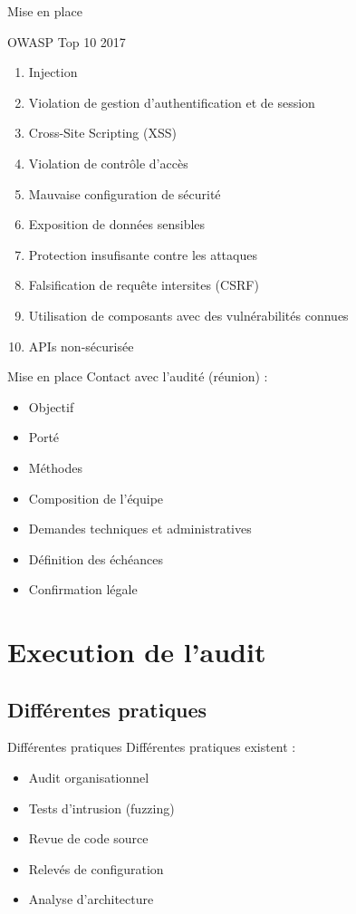 \documentclass{beamer}
\newcommand{\colorized}[1]{{\color{red}{#1}}}
\begin{document}
		\begin{frame}{Mise en place}
			\begin{block}{OWASP Top 10 2017}
				\begin{enumerate}
					\item Injection
					\item Violation de gestion d'authentification et de session
					\item Cross-Site Scripting (XSS)
					\item Violation de contrôle d'accès
					\item Mauvaise configuration de sécurité
					\item Exposition de données sensibles
					\item Protection insufisante contre les attaques
					\item Falsification de requête intersites (CSRF)
					\item Utilisation de composants avec des vulnérabilités connues
					\item APIs non-sécurisée
				\end{enumerate}
			\end{block}
		\end{frame}
		
		\begin{frame}{Mise en place}
			Contact avec l'audité (réunion) : 
			\begin{itemize}
				\item Objectif \colorized{Garantir une application sans failles de l'OWASP Top 10}
				\item Porté \colorized{Application web}
				\item Méthodes \colorized{Boite blanche}
				\item Composition de l'équipe
				\item Demandes techniques et administratives \colorized{code source}
				\item Définition des échéances \colorized{\today}
				\item Confirmation légale
			\end{itemize}		
		\end{frame}
		
	\section{Execution de l'audit}	
		\subsection{Différentes pratiques}
			\begin{frame}{Différentes pratiques}
				Différentes pratiques existent : 
				\begin{itemize}
					\item Audit organisationnel
					\item Tests d'intrusion (fuzzing)				
					\item Revue de code source
					\item Relevés de configuration
					\item Analyse d'architecture	
				\end{itemize}		
			\end{frame}
		
\end{document}
